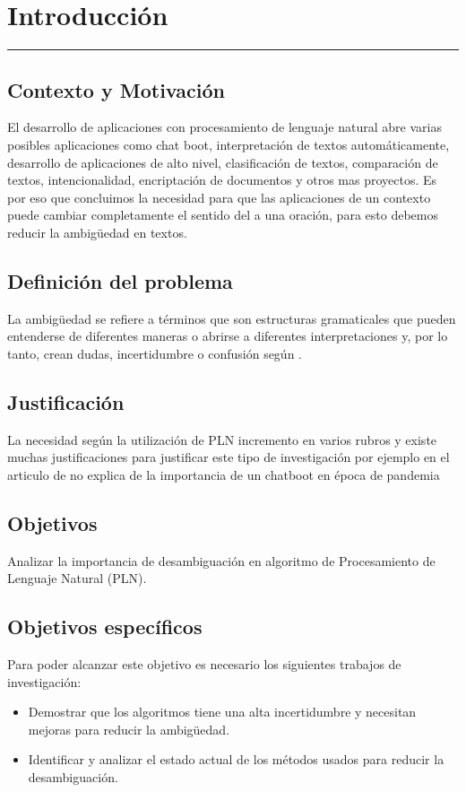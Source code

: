 \chapter{Introducción}
\hrule \bigskip \vspace*{1cm}
\section{Contexto y Motivación}
El desarrollo de aplicaciones con procesamiento de lenguaje natural abre varias posibles aplicaciones como chat boot, interpretación de textos automáticamente, desarrollo de aplicaciones de alto nivel, clasificación de textos, comparación de textos, intencionalidad, encriptación de documentos y otros mas proyectos. Es por eso que concluimos la necesidad para que las aplicaciones  de un contexto puede cambiar completamente el sentido del  a una oración, para esto debemos reducir la ambigüedad en textos.

\section{Definición del problema}
La ambigüedad se refiere a términos que son estructuras gramaticales que pueden entenderse de diferentes maneras o abrirse a diferentes interpretaciones y, por lo tanto, crean dudas, incertidumbre o confusión según \cite{EvaluacionAmbiguedad01}.

\section{Justificación}
La necesidad según \cite{Arquitectura} la utilización de PLN incremento en varios rubros y
existe muchas justificaciones para justificar este tipo de investigación por ejemplo en el articulo de \cite{ChatBoot} no explica de la importancia de un chatboot en época de pandemia


\section{Objetivos}

 Analizar la importancia de desambiguación en algoritmo de Procesamiento de Lenguaje Natural (PLN).

\section{Objetivos específicos}
Para poder alcanzar este objetivo es necesario los siguientes trabajos de investigación:
\begin{itemize}
  \item Demostrar que los algoritmos tiene una alta incertidumbre y necesitan mejoras para reducir la ambigüedad.
  \item Identificar y analizar el estado actual de los métodos usados para reducir la desambiguación.
\end{itemize}

